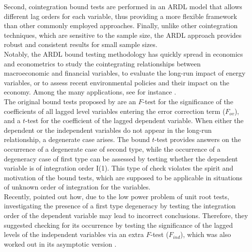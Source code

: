 Second, cointegration bound tests are performed in an ARDL model that allows different lag orders for each variable, thus providing a more flexible framework than other commonly employed approaches.
Finally, unlike other cointegration techniques, which are sensitive to the sample size, the ARDL approach provides robust and consistent results for small sample sizes.\\ 
Notably, the ARDL bound testing methodology has quickly spread in economics and econometrics to study the cointegrating relationships between macroeconomic and financial variables, to evaluate the long-run impact of energy variables, or to assess recent environmental policies and their impact on the economy. Among the many applications, see for instance \citet{haseeb2019impact,reda2020using, menegaki2019ardl,yilanci2020brics,hussain2019environmental,abbasi2021energy}.\\
The original bound tests proposed by \citet{pesaran2001} are an $F$-test for the significance of the coefficients of all lagged level variables entering the error correction term ($F_{ov}$), and a $t$-test for the coefficient of the lagged dependent variable. When either the dependent or the independent variables do not appear in the long-run relationship, a degenerate case arises. The bound $t$-test provides answers on the occurrence of a degenerate case of second type, while the occurrence of a degeneracy case of first type can be assessed by testing whether the dependent variable is of integration order I(1).
This type of check violates the spirit and motivation of the bound tests, which are supposed to be applicable in situations of unknown order of integration for the variables.\\ 
Recently, \citet{mcnown2018bootstrapping} pointed out how, due to the low power problem of unit root tests, investigating the presence of a first type degeneracy by testing the integration order of the dependent variable may lead to incorrect conclusions. Therefore, they suggested checking for its occurrence by testing the significance of the lagged levels of the independent variables via an extra $F$-test ($F_{ind}$), which was also worked out in its asymptotic version \citep[SMK;][]{sam2019augmented}.\\
